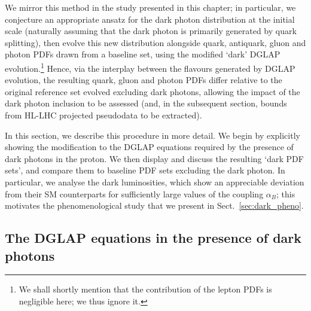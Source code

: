 \documentclass[withindex,glossary]{cam-thesis}
\begin{document}
We mirror this method in the study presented in this chapter; in particular, we conjecture
an appropriate ansatz for the dark photon distribution at the initial scale (naturally assuming that
the dark photon is primarily generated by quark splitting),
then evolve this new distribution alongside quark, antiquark,
gluon and photon PDFs drawn from a baseline set, using the modified `dark' DGLAP evolution.\footnote{We shall shortly mention that the contribution of the lepton PDFs is negligible here;
we thus ignore it.}
Hence, via the interplay between the flavours generated by
DGLAP evolution, the resulting quark, gluon and photon PDFs differ relative
to the original reference set evolved excluding dark photons, allowing the impact
of the dark photon inclusion to be assessed (and, in the subsequent section, bounds from HL-LHC
projected pseudodata to be extracted).

In this section, we describe this procedure in more detail.
We begin by explicitly showing the modification to the DGLAP equations
required by the presence of dark photons in the proton.
We then display and discuss the resulting `dark PDF sets',
and compare them to baseline PDF sets excluding the dark photon.
In particular, we analyse the dark luminosities, which show an appreciable deviation
from their SM counterparts for sufficiently large values of the coupling $\alpha_B$;
this motivates the phenomenological study that we present in Sect.~\ref{sec:dark_pheno}.


\subsection{The DGLAP equations in the presence of dark photons}
\label{subsec:dglap}

\end{document}
